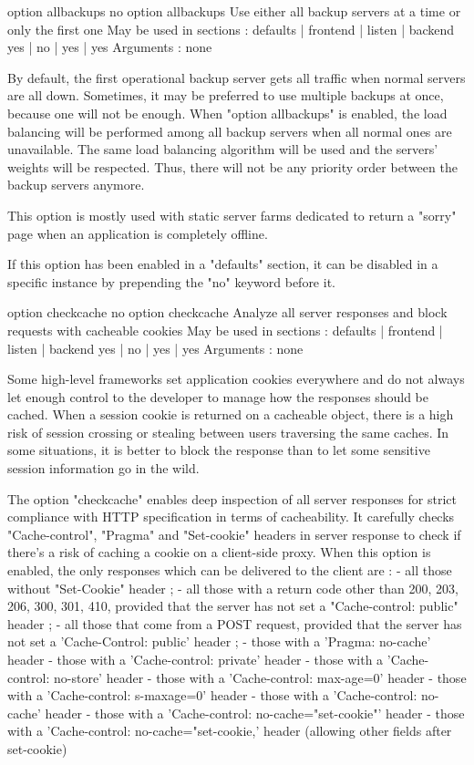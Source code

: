 option allbackups
no option allbackups
  Use either all backup servers at a time or only the first one
  May be used in sections :   defaults | frontend | listen | backend
                                 yes   |     no   |   yes  |   yes
  Arguments : none

  By default, the first operational backup server gets all traffic when normal
  servers are all down. Sometimes, it may be preferred to use multiple backups
  at once, because one will not be enough. When "option allbackups" is enabled,
  the load balancing will be performed among all backup servers when all normal
  ones are unavailable. The same load balancing algorithm will be used and the
  servers' weights will be respected. Thus, there will not be any priority
  order between the backup servers anymore.

  This option is mostly used with static server farms dedicated to return a
  "sorry" page when an application is completely offline.

  If this option has been enabled in a "defaults" section, it can be disabled
  in a specific instance by prepending the "no" keyword before it.


option checkcache
no option checkcache
  Analyze all server responses and block requests with cacheable cookies
  May be used in sections :   defaults | frontend | listen | backend
                                 yes   |     no   |   yes  |   yes
  Arguments : none

  Some high-level frameworks set application cookies everywhere and do not
  always let enough control to the developer to manage how the responses should
  be cached. When a session cookie is returned on a cacheable object, there is a
  high risk of session crossing or stealing between users traversing the same
  caches. In some situations, it is better to block the response than to let
  some sensitive session information go in the wild.

  The option "checkcache" enables deep inspection of all server responses for
  strict compliance with HTTP specification in terms of cacheability. It
  carefully checks "Cache-control", "Pragma" and "Set-cookie" headers in server
  response to check if there's a risk of caching a cookie on a client-side
  proxy. When this option is enabled, the only responses which can be delivered
  to the client are :
    - all those without "Set-Cookie" header ;
    - all those with a return code other than 200, 203, 206, 300, 301, 410,
      provided that the server has not set a "Cache-control: public" header ;
    - all those that come from a POST request, provided that the server has not
      set a 'Cache-Control: public' header ;
    - those with a 'Pragma: no-cache' header
    - those with a 'Cache-control: private' header
    - those with a 'Cache-control: no-store' header
    - those with a 'Cache-control: max-age=0' header
    - those with a 'Cache-control: s-maxage=0' header
    - those with a 'Cache-control: no-cache' header
    - those with a 'Cache-control: no-cache="set-cookie"' header
    - those with a 'Cache-control: no-cache="set-cookie,' header
      (allowing other fields after set-cookie)

